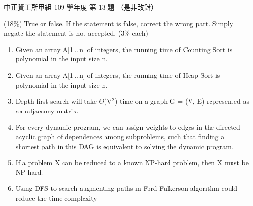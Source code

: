 \begin{pastexam}[label={px:ccu-109-swa-08}]{中正資工所甲組 109 學年度 第 13 題}
（是非改錯）

(18\%) True or false. If the statement is false, correct the wrong part. Simply negate the statement
is not accepted. (3\% each)
\begin{enumerate}[label=(\arabic*)]
\item Given an array A[1\,..\,n] of integers, the running time of Counting Sort is polynomial in the
input size n.
\item Given an array A[1\,..\,n] of integers, the running time of Heap Sort is polynomial in the input
size n.
\item Depth-first search will take $\Theta$(V$^2$) time on a graph G = (V, E) represented as an
adjacency matrix.
\item For every dynamic program, we can assign weights to edges in the directed acyclic graph of
dependences among subproblems, such that finding a shortest path in this DAG is equivalent to
solving the dynamic program.
\item If a problem X can be reduced to a known NP-hard problem, then X must be NP-hard.
\item Using DFS to search augmenting paths in Ford-Fulkerson algorithm could reduce the time
complexity
\end{enumerate}
\end{pastexam}

